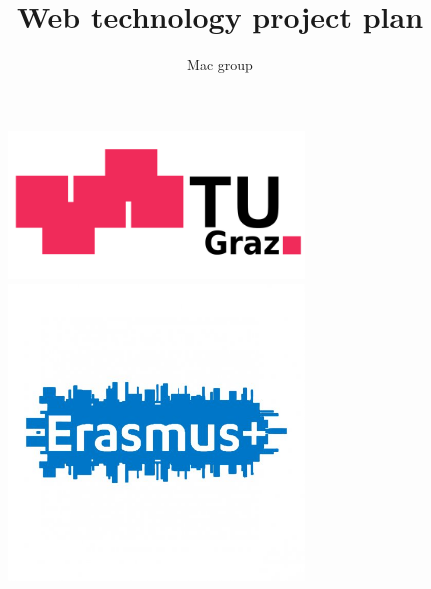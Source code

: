 \documentclass[12pt]{article}
\begin{document}
    \begin{titlepage}
        \title{Web technology project plan}
        \author{Mac group}

        \begin{figure}
            \begin{minipage}[c]{0.40\linewidth}
                \includegraphics[width=0.7\textwidth]{TUGraz.png}
            \end{minipage}
            \hfill
            \begin{minipage}[c]{0.48\linewidth}
                \hfill
                \includegraphics[width=0.7\textwidth]{Erasmus.jpeg}
            \end{minipage}
        \end{figure}


\end{titlepage}
\end{document}
